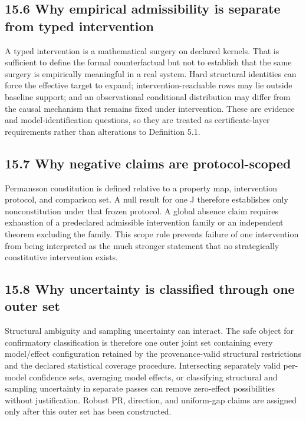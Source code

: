 \documentclass[10pt]{article}
\begin{document}
\subsection{15.6 Why empirical admissibility is separate from typed
intervention}\label{why-empirical-admissibility-is-separate-from-typed-intervention}

A typed intervention is a mathematical surgery on declared kernels. That
is sufficient to define the formal counterfactual but not to establish
that the same surgery is empirically meaningful in a real system. Hard
structural identities can force the effective target to expand;
intervention-reachable rows may lie outside baseline support; and an
observational conditional distribution may differ from the causal
mechanism that remains fixed under intervention. These are evidence and
model-identification questions, so they are treated as
certificate-layer requirements rather than alterations to Definition 5.1.

\subsection{15.7 Why negative claims are
protocol-scoped}\label{why-negative-claims-are-protocol-scoped}

Permansson constitution is defined relative to a property map,
intervention protocol, and comparison set. A null result for one J
therefore establishes only nonconstitution under that frozen protocol. A
global absence claim requires exhaustion of a predeclared admissible
intervention family or an independent theorem excluding the family. This
scope rule prevents failure of one intervention from being interpreted as
the much stronger statement that no strategically constitutive
intervention exists.

\subsection{15.8 Why uncertainty is classified through one outer
set}\label{why-uncertainty-is-classified-through-one-outer-set}

Structural ambiguity and sampling uncertainty can interact. The safe
object for confirmatory classification is therefore one outer joint set
containing every model/effect configuration retained by the
provenance-valid structural restrictions and the declared statistical
coverage procedure. Intersecting separately valid per-model confidence
sets, averaging model effects, or classifying structural and sampling
uncertainty in separate passes can remove zero-effect possibilities
without justification. Robust PR, direction, and uniform-gap claims are
assigned only after this outer set has been constructed.
\end{document}
